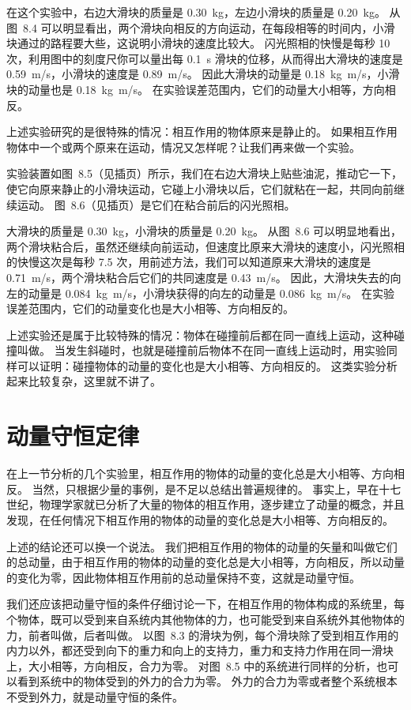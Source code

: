 在这个实验中，右边大滑块的质量是 \qty{0.30}{kg}，左边小滑块的质量是 \qty{0.20}{kg}。
从图~8.4 可以明显看出，两个滑块向相反的方向运动，在每段相等的时间内，小滑块通过的路程要大些，这说明小滑块的速度比较大。
闪光照相的快慢是每秒 10 次，利用图中的刻度尺你可以量出每 \qty{0.1}{s} 滑块的位移，从而得出大滑块的速度是 \qty{0.59}{m/s}，小滑块的速度是 \qty{0.89}{m/s}。
因此大滑块的动量是 \qty{0.18}{kg.m/s}，小滑块的动量也是 \qty{0.18}{kg.m/s}。
在实验误差范围内，它们的动量大小相等，方向相反。

上述实验研究的是很特殊的情况：相互作用的物体原来是静止的。
如果相互作用物体中一个或两个原来在运动，情况又怎样呢？让我们再来做一个实验。

实验装置如图~8.5（见插页）所示，我们在右边大滑块上贴些油泥，推动它一下，使它向原来静止的小滑块运动，它碰上小滑块以后，它们就粘在一起，共同向前继续运动。
图~8.6（见插页）是它们在粘合前后的闪光照相。

大滑块的质量是 \qty{0.30}{kg}，小滑块的质量是 \qty{0.20}{kg}。
从图~8.6 可以明显地看出，两个滑块粘合后，虽然还继续向前运动，但速度比原来大滑块的速度小，闪光照相的快慢这次是每秒 7.5 次，用前述方法，我们可以知道原来大滑块的速度是 \qty{0.71}{m/s}，两个滑块粘合后它们的共同速度是 \qty{0.43}{m/s}。
因此，大滑块失去的向左的动量是 \qty{0.084}{kg.m/s}，小滑块获得的向左的动量是 \qty{0.086}{kg.m/s}。
在实验误差范围内，它们的动量变化也是大小相等、方向相反的。

上述实验还是属于比较特殊的情况：物体在碰撞前后都在同一直线上运动，这种碰撞叫做。
当发生斜碰时，也就是碰撞前后物体不在同一直线上运动时，用实验同样可以证明：碰撞物体的动量的变化也是大小相等、方向相反的。
这类实验分析起来比较复杂，这里就不讲了。

\section{动量守恒定律}\label{sec:momentum_law}
在上一节分析的几个实验里，相互作用的物体的动量的变化总是大小相等、方向相反。
当然，只根据少量的事例，是不足以总结出普遍规律的。
事实上，早在十七世纪，物理学家就已分析了大量的物体的相互作用，逐步建立了动量的概念，并且发现，在任何情况下相互作用的物体的动量的变化总是大小相等、方向相反的。

上述的结论还可以换一个说法。
我们把相互作用的物体的动量的矢量和叫做它们的总动量，由于相互作用的物体的动量的变化总是大小相等，方向相反，所以动量的变化为零，因此物体相互作用前的总动量保持不变，这就是动量守恒。

我们还应该把动量守恒的条件仔细讨论一下，在相互作用的物体构成的系统里，每个物体，既可以受到来自系统内其他物体的力，也可能受到来自系统外其他物体的力，前者叫做，后者叫做。
以图~8.3 的滑块为例，每个滑块除了受到相互作用的内力以外，都还受到向下的重力和向上的支持力，重力和支持力作用在同一滑块上，大小相等，方向相反，合力为零。
对图~8.5 中的系统进行同样的分析，也可以看到系统中的物体受到的外力的合力为零。
外力的合力为零或者整个系统根本不受到外力，就是动量守恒的条件。

